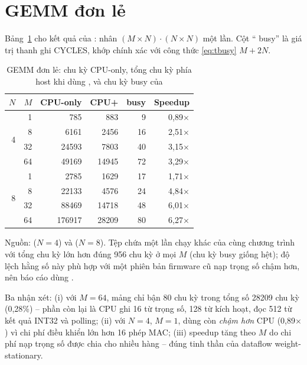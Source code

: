 \section{GEMM đơn lẻ}
\label{sec:res-gemm}
Bảng~\ref{tab:gemm} cho kết quả của : nhân $(M\times N)\cdot(N\times N)$ một lần. Cột ``\NPU{} busy'' là giá trị thanh ghi CYCLES, khớp chính xác với công thức \eqref{eq:tbusy} $M+2N$.

\begin{table}[H]
  \centering
  \caption{GEMM đơn lẻ: chu kỳ CPU-only, tổng chu kỳ phía host khi dùng \NPU{}, và chu kỳ busy của \NPU{}}
  \label{tab:gemm}
  \begin{tabular}{rrrrrr}
    \toprule
    $N$ & $M$ & CPU-only & CPU+\NPU{} & \NPU{} busy & Speedup\\
    \midrule
    \multirow{4}{*}{4} & 1 & 785 & 883 & 9 & 0,89$\times$ \\
     & 8 & \num{6161} & \num{2456} & 16 & 2,51$\times$ \\
     & 32 & \num{24593} & \num{7803} & 40 & 3,15$\times$ \\
     & 64 & \num{49169} & \num{14945} & 72 & 3,29$\times$ \\
    \midrule
    \multirow{4}{*}{8} & 1 & \num{2785} & \num{1629} & 17 & 1,71$\times$ \\
     & 8 & \num{22133} & \num{4576} & 24 & 4,84$\times$ \\
     & 32 & \num{88469} & \num{14718} & 48 & 6,01$\times$ \\
     & 64 & \num{176917} & \num{28209} & 80 & 6,27$\times$ \\
    \bottomrule
  \end{tabular}

  \smallskip
  \raggedright\footnotesize Nguồn:  ($N=4$) và  ($N=8$). Tệp  chứa một lần chạy khác của cùng chương trình với tổng chu kỳ \NPU{} lớn hơn đúng 956 chu kỳ ở mọi $M$ (chu kỳ busy giống hệt); độ lệch hằng số này phù hợp với một phiên bản firmware cũ nạp trọng số chậm hơn, nên báo cáo dùng .
\end{table}

Ba nhận xét: (i) với $M=64$, mảng chỉ bận 80 chu kỳ trong tổng số \num{28209} chu kỳ (0,28\%) -- phần còn lại là CPU ghi \num{16} từ trọng số, \num{128} từ kích hoạt, đọc \num{512} từ kết quả INT32 và polling; (ii) với $N=4$, $M=1$, dùng \NPU{} còn \emph{chậm hơn} CPU (0,89$\times$) vì chi phí điều khiển lớn hơn 16 phép MAC; (iii) speedup tăng theo $M$ do chi phí nạp trọng số được chia cho nhiều hàng -- đúng tinh thần của dataflow weight-stationary.

